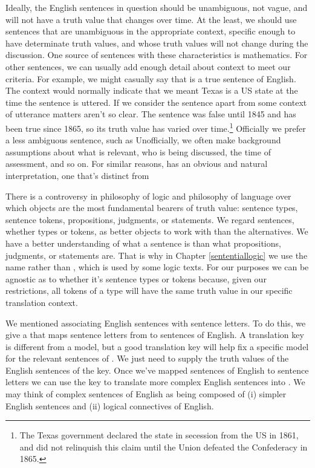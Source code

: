 Ideally, the English sentences in question should be unambiguous, not vague, and will not have a truth value that changes over time. At the least, we should use sentences that are unambiguous in the appropriate context, specific enough to have determinate truth values, and whose truth values will not change during the discussion.  One source of sentences with these characteristics is mathematics.  For other sentences, we can usually add enough detail about context to meet our criteria.  For example, we might casually say that  is a true sentence of English.  The context would normally indicate that we meant Texas is a US state at the time the sentence is uttered.  If we consider the sentence apart from some context of utterance matters aren't so clear.  The sentence was false until 1845 and has been true since 1865, so its truth value has varied over time.\footnote{The Texas government declared the state in secession from the US in 1861, and did not relinquish this claim until the Union defeated the Confederacy in 1865.}  Officially we prefer a less ambiguous sentence, such as   Unofficially, we often make background assumptions about what is relevant, who is being discussed, the time of assessment, and so on.  For similar reasons,  has an obvious and natural interpretation, one that's distinct from 

There is a controversy in philosophy of logic and philosophy of language over which objects are the most fundamental bearers of truth value: sentence types, sentence tokens, propositions, judgments, or statements.  We regard sentences, whether types or tokens, as better objects to work with than the alternatives.  We have a better understanding of what a sentence is than what propositions, judgments, or statements are.  That is why in Chapter \ref{sententiallogic} we use the name  rather than , which is used by some logic texts.  For our purposes we can be agnostic as to whether it's sentence types or tokens because, given our restrictions, all tokens of a type will have the same truth value in our specific translation context. 

We mentioned associating English sentences with \GSL{} sentence letters.  To do this, we give a  that maps sentence letters from \GSL{} to sentences of English.  A translation key is different from a model, but a good translation key will help fix a specific model for the relevant sentences of \GSL{}.  We just need to supply the truth values of the English sentences of the key.  Once we've mapped sentences of English to sentence letters we can use the key to translate more complex English sentences into \GSL{}.  We may think of complex sentences of English as being composed of (i) simpler English sentences and (ii) logical connectives of English.


